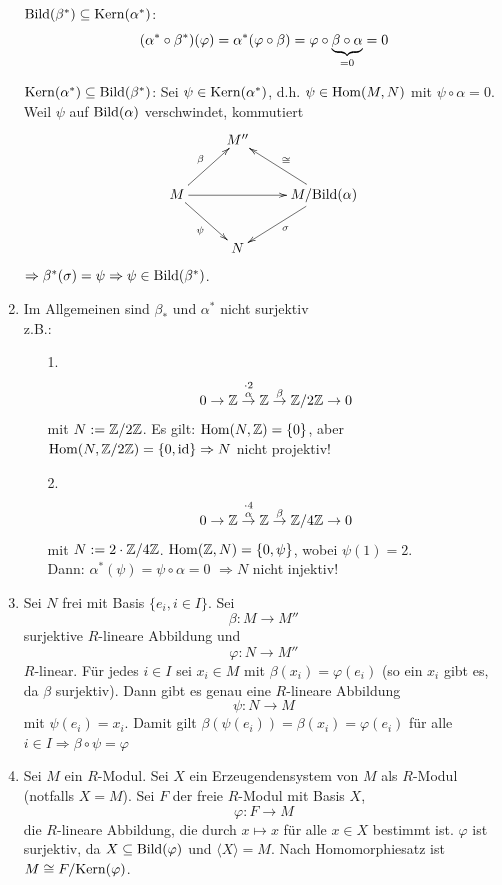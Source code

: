 \documentclass[a4paper, 10pt]{report}
\begin{document}
\begin{Bew}
\begin{enumerate}
	  $\mathrm{Bild}(\beta^*) \subseteq \mathrm{Kern}(\alpha^*)$:
	  \[
	  (\alpha^* \circ 
	  \beta^*)(\varphi)= \alpha^*(\varphi\circ \beta)=\varphi \circ
	  \underbrace{\beta \circ \alpha}_{=0}=0
	  \]

	  $\mathrm{Kern}(\alpha^*)\subseteq\mathrm{Bild}(\beta^*)$: Sei $\psi \in 
	  \mathrm{Kern}(\alpha^*)$, d.h. $\psi \in \Hom{M}{N}$ mit $\psi
	  \circ\alpha=0$.
	  Weil $\psi$ auf $\mathrm{Bild}(\alpha)$ verschwindet, kommutiert
	  \[
            \begin{xy}
              \xymatrix{
                                 & M'' &\\
                M \ar[rd]_{\psi} \ar[ur]^{\beta} \ar[rr] &     &  M/\B{\alpha}
                \ar[dl]^\sigma \ar[ul]_{\cong}\\
                &  N  & }
            \end{xy}
          \]
		  $\Rightarrow \beta^*(\sigma)= \psi \Rightarrow \psi\in\mathrm{Bild}(\beta^*)$.
	\item Im Allgemeinen sind $\beta_*$ und $\alpha^*$ nicht surjektiv\\
		z.B.: \begin{enumerate}
		\item[1.]
		\[
		0\rightarrow \mathbb{Z} \stackrel{\cdot2}{\stackrel{\alpha}\rightarrow} 
		\mathbb{Z} \stackrel\beta\rightarrow \mathbb{Z} / 2\mathbb{Z}\rightarrow 0
		\]
		mit $N:= \mathbb{Z} / 2\mathbb{Z}$.
		Es gilt: $\Hom{N}{\ZZ}=\{0\}$, aber
		$\Hom{N}{\ZZ/2\ZZ}=\{0, \id\}  \Rightarrow  N$ nicht projektiv!
		\item[2.]
		\[
		0\rightarrow \mathbb{Z} \stackrel{\cdot4}{\stackrel{\alpha}\rightarrow} \mathbb{Z} 
		\stackrel\beta\rightarrow \mathbb{Z} / 4\mathbb{Z}\rightarrow 0
		\]
		mit $N:= 2\cdot \mathbb{Z} / 4\mathbb{Z}$.
		$\Hom{\ZZ}{N}= \{0, \psi\}$, wobei $\psi(1)=2$.\\
		Dann: $\alpha^*(\psi)=\psi\circ \alpha = 0$ $\Rightarrow N$ nicht injektiv!
		\end{enumerate}
      \item Sei $N$ frei mit Basis $\{e_i,i \in I\}$.
            Sei 
            \[
            \beta: M \to M''
            \]
            surjektive $R$-lineare Abbildung und
            \[
            \varphi: N \to M''
            \]
            $R$-linear. Für jedes $i \in I$ sei $x_i \in M$
            mit $\beta(x_i) = \varphi(e_i)$ (so ein $x_i$ gibt es, da $\beta$
            surjektiv). Dann gibt es genau eine $R$-lineare Abbildung
            \[
            \psi: N \to M
            \]
            mit $\psi(e_i) = x_i$. Damit gilt $\beta(\psi(e_i)) =
            \beta(x_i) = \varphi(e_i)$ für alle $i \in I \Rightarrow \beta \circ
            \psi = \varphi$
      \item \label{1.5fBew}
            Sei $M$ ein $R$-Modul. Sei $X$ ein Erzeugendensystem von $M$ als
            $R$-Modul (notfalls $X = M$). Sei $F$ der freie $R$-Modul mit Basis
            $X$,
            \[
            \varphi: F \to M
            \]
            die $R$-lineare Abbildung, die durch $x
            \mapsto x$ für alle $x \in X$ bestimmt ist. $\varphi$ ist surjektiv,
            da $X \subseteq \mathrm{Bild}(\varphi)$ und $\langle X \rangle = M$.
            Nach Homomorphiesatz ist $M \cong F/\mathrm{Kern}(\varphi)$.
  \end{enumerate}
\end{Bew}
\end{document}
